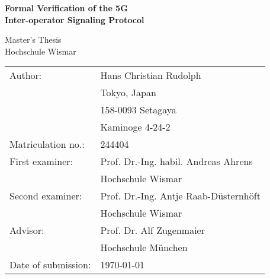 \begin{titlepage}
\centering

\vspace*{3cm}

{
    \Huge{
        \textbf{Formal Verification of the 5G\\
        \vspace{4mm}
        Inter-operator Signaling Protocol}
    }
}

\vspace{1cm}

\centering

\LARGE
Master's Thesis\\
Hochschule Wismar

\vspace{2cm}

\vfill
{
    \renewcommand{\arraystretch}{1.1}
    {

    \begin{table}[h!]
    \centering
    \large
    \begin{tabular}{ll}
    Author:             & Hans Christian Rudolph               \\
                        & Tokyo, Japan                         \\
                        & 158-0093 Setagaya                    \\
                        & Kaminoge 4-24-2                      \\
        Matriculation no.:  & 244404                           \vspace{3mm}\\
    First examiner:     & Prof. Dr.-Ing. habil. Andreas Ahrens \\
                        & Hochschule Wismar                    \\
    Second examiner:    & Prof. Dr.-Ing. Antje Raab-Düsternhöft\\
                        & Hochschule Wismar                    \\
    Advisor:            & Prof. Dr. Alf Zugenmaier             \\\vspace{3mm}
                        & Hochschule München                   \\
    Date of submission: & \today
    \end{tabular}
    \end{table}
    }
}

\vspace{2cm}

\end{titlepage}
